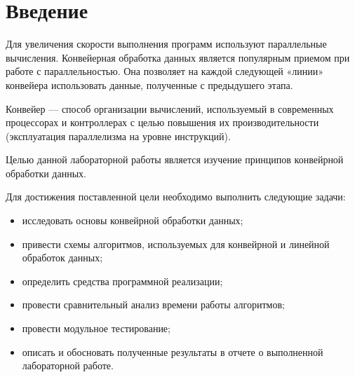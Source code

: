 \chapter*{Введение}

Для увеличения скорости выполнения программ используют параллельные вычисления. Конвейерная обработка данных является популярным приемом при работе с параллельностью. Она позволяет на каждой следующей «линии» конвейера использовать данные, полученные с предыдушего этапа.

Конвейер — способ организации вычислений, используемый в современных процессорах и контроллерах с целью повышения их производительности (эксплуатация параллелизма на уровне инструкций).

Целью данной лабораторной работы является изучение принципов конвейрной обработки данных.

Для достижения поставленной цели необходимо выполнить следующие задачи:

\begin{itemize}[label=---]
	\item исследовать основы конвейрной обработки данных;
	\item привести схемы алгоритмов, используемых для конвейрной и линейной обработок данных;
	\item определить средства программной реализации;
	\item провести сравнительный анализ времени работы алгоритмов;
	\item провести модульное тестирование;
	\item описать и обосновать полученные результаты в отчете о выполненной лабораторной работе.
\end{itemize}
